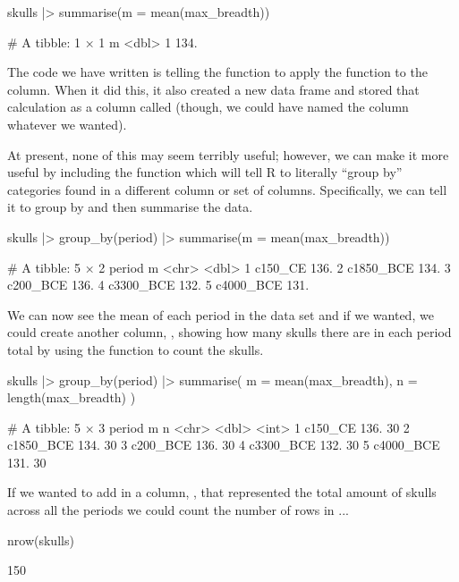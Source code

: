 \begin{inR}
skulls |> 
  summarise(m = mean(max_breadth))
\end{inR}

\begin{outR}
# A tibble: 1 × 1
      m
  <dbl>
1  134.
\end{outR}

The code we have written is telling the  function to apply the  function to the  column. When it did this, it also created a new data frame and stored that calculation as a column called  (though, we could have named the column whatever we wanted).

At present, none of this may seem terribly useful; however, we can make it more useful by including the  function which will tell R to literally ``group by'' categories found in a different column or set of columns. Specifically, we can tell it to group by  and then summarise the data.

\begin{inR}
skulls |> 
  group_by(period) |> 
  summarise(m = mean(max_breadth))
\end{inR}
\begin{outR}
# A tibble: 5 × 2
  period        m
  <chr>     <dbl>
1 c150_CE    136.
2 c1850_BCE  134.
3 c200_BCE   136.
4 c3300_BCE  132.
5 c4000_BCE  131.
\end{outR}

We can now see the mean of each period in the data set and if we wanted, we could create another column, , showing how many skulls there are in each period total by using the  function to count the skulls.

\begin{inR}
skulls |> 
  group_by(period) |> 
  summarise(
    m = mean(max_breadth),
    n = length(max_breadth)
    )
\end{inR}
\begin{outR}
# A tibble: 5 × 3
  period        m     n
  <chr>     <dbl> <int>
1 c150_CE    136.    30
2 c1850_BCE  134.    30
3 c200_BCE   136.    30
4 c3300_BCE  132.    30
5 c4000_BCE  131.    30
\end{outR}

If we wanted to add in a column, , that represented the total amount of skulls across all the periods we could count the number of rows in ...

\begin{inR}
nrow(skulls)
\end{inR}
\begin{outR}
[1] 150
\end{outR}

